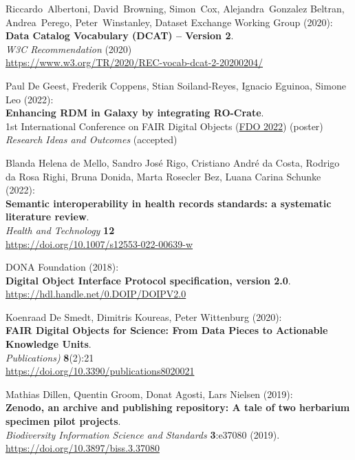 \begin{thebibliography}{9}
Riccardo~Albertoni, David~Browning, Simon~Cox,
Alejandra~Gonzalez Beltran, Andrea~Perego, Peter~Winstanley, Dataset
Exchange Working Group (2020):\\
\textbf{Data Catalog Vocabulary (DCAT) -- Version 2}.\\
\emph{W3C Recommendation} (2020)\\
\url{https://www.w3.org/TR/2020/REC-vocab-dcat-2-20200204/}


Paul De Geest, Frederik Coppens, Stian
Soiland-Reyes, Ignacio Eguinoa, Simone Leo (2022):\\
\textbf{Enhancing RDM in Galaxy by integrating RO-Crate}.\\
1st International Conference on FAIR Digital Objects
(\href{https://www.fdo2022.org/}{FDO 2022}) (poster)\\
\emph{Research Ideas and Outcomes} (accepted)

Blanda Helena de Mello, Sandro José Rigo, Cristiano
André da Costa, Rodrigo da Rosa Righi, Bruna Donida, Marta Rosecler Bez,
Luana Carina Schunke (2022):\\
\textbf{Semantic interoperability in health records standards: a
systematic literature review}.\\
\emph{Health and Technology} \textbf{12}\\
\url{https://doi.org/10.1007/s12553-022-00639-w}

DONA Foundation (2018):\\
\textbf{Digital Object Interface Protocol specification, version 2.0}.\\
\url{https://hdl.handle.net/0.DOIP/DOIPV2.0}

Koenraad De Smedt, Dimitris Koureas, Peter
Wittenburg (2020):\\
\textbf{FAIR Digital Objects for Science: From Data Pieces to Actionable
Knowledge Units}.\\
\emph{Publications)} \textbf{8}(2):21\\
\url{https://doi.org/10.3390/publications8020021}


Mathias Dillen, Quentin Groom, Donat Agosti, Lars Nielsen
(2019):\\
\textbf{Zenodo, an archive and publishing repository: A tale of two
herbarium specimen pilot projects}.\\
\emph{Biodiversity Information Science and Standards} \textbf{3}:e37080
(2019).\\
\url{https://doi.org/10.3897/biss.3.37080}


\end{thebibliography}
